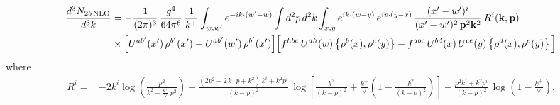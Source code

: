 \documentclass[9pt]{article}
\numberwithin{equation}{section}
\begin{document}
\begin{align}
\frac{d^{3}N_{2b\,\rm NLO}}{d^{3}k} & = -\frac{1}{(2\pi)^{3}}\,\frac{g^{4}}{64\pi^{6}}\,\frac{1}{k^{+}}\int_{w,w'} e^{-ik\cdot(w'-w)}
\int d^{2}p\,d^{2}k\int_{x,y} e^{ik\cdot(w-y)}\,e^{ip\cdot(y-x)}\,\frac{(x'-w')^{i}}{(x'-w')^{2}\,\mathbf{p}^{2}\mathbf{k}^{2}}\,R^{i}(\mathbf{k},\mathbf{p})\notag\\
&\times\Big[U^{ab'}(x')\,\rho^{b'}(x')-U^{ab'}(w')\,\rho^{b'}(x')\Big]
\Big[f^{hbc}\,U^{ah}(w)\left\{\rho^{b}(x),\rho^{c}(y)\right\}-f^{abc}\,U^{bd}(x)\,U^{ce}(y)\left\{\rho^{d}(x),\rho^{e}(y)\right\}\Big]
\end{align}
where
\begin{align}
R^{i} =& -2k^{i}\log\left(\frac{p^{2}}{k^{2}+\frac{k^{+}}{\vee}\,p^{2}}\right)
+\frac{(2p^{2}-2\,k\cdot p+k^{2})\,k^{i}+k^{2}p^{i}}{(k-p)^{2}}\,
\log\left[\frac{k^{2}}{(k-p)^{2}}+\frac{k^{+}}{\vee}\left(1-\frac{k^{2}}{(k-p)^{2}}\right)\right]
-\frac{p^{2}k^{i}+k^{2}p^{i}}{(k-p)^{2}}\,\log\left(1-\frac{k^{+}}{\vee}\right).
\end{align}
\end{document}
